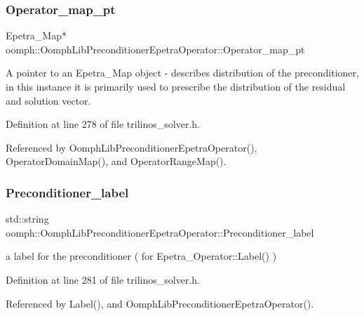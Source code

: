 \subsubsection{\texorpdfstring{Operator\+\_\+map\+\_\+pt}{Operator\_map\_pt}}
{\footnotesize\ttfamily Epetra\+\_\+\+Map$\ast$ oomph\+::\+Oomph\+Lib\+Preconditioner\+Epetra\+Operator\+::\+Operator\+\_\+map\+\_\+pt\hspace{0.3cm}{\ttfamily [private]}}



A pointer to an Epetra\+\_\+\+Map object -\/ describes distribution of the preconditioner, in this instance it is primarily used to prescribe the distribution of the residual and solution vector. 



Definition at line 278 of file trilinos\+\_\+solver.\+h.



Referenced by Oomph\+Lib\+Preconditioner\+Epetra\+Operator(), Operator\+Domain\+Map(), and Operator\+Range\+Map().

\mbox{\label{classoomph_1_1OomphLibPreconditionerEpetraOperator_a9f1c739fe5868b1d9dcaee080d63cb5b}} 
\subsubsection{\texorpdfstring{Preconditioner\+\_\+label}{Preconditioner\_label}}
{\footnotesize\ttfamily std\+::string oomph\+::\+Oomph\+Lib\+Preconditioner\+Epetra\+Operator\+::\+Preconditioner\+\_\+label\hspace{0.3cm}{\ttfamily [private]}}



a label for the preconditioner ( for Epetra\+\_\+\+Operator\+::\+Label() ) 



Definition at line 281 of file trilinos\+\_\+solver.\+h.



Referenced by Label(), and Oomph\+Lib\+Preconditioner\+Epetra\+Operator().

